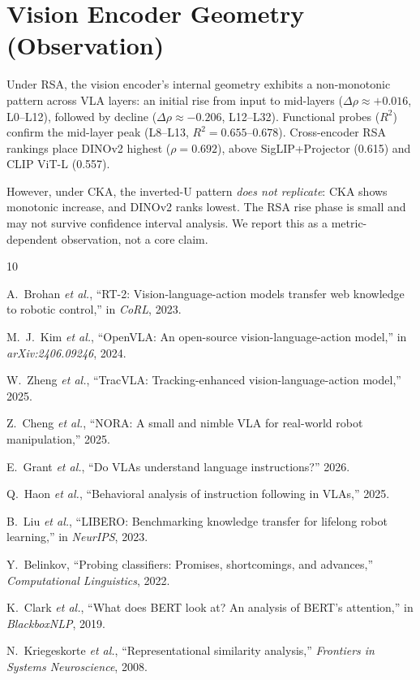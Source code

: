 \documentclass[10pt,twocolumn]{article}
\newcommand{\etal}{\textit{et al.}}
\begin{document}
\appendix
\section{Vision Encoder Geometry (Observation)}
\label{app:c3}

Under RSA, the vision encoder's internal geometry exhibits a non-monotonic pattern across VLA layers: an initial rise from input to mid-layers ($\Delta\rho \approx +0.016$, L0--L12), followed by decline ($\Delta\rho \approx -0.206$, L12--L32).
Functional probes ($R^2$) confirm the mid-layer peak (L8--L13, $R^2 = 0.655$--$0.678$).
Cross-encoder RSA rankings place DINOv2 highest ($\rho = 0.692$), above SigLIP+Projector (0.615) and CLIP ViT-L (0.557).

However, under CKA, the inverted-U pattern \emph{does not replicate}: CKA shows monotonic increase, and DINOv2 ranks lowest.
The RSA rise phase is small and may not survive confidence interval analysis.
We report this as a metric-dependent observation, not a core claim.

{\small

\begin{thebibliography}{10}

A.~Brohan \etal, ``RT-2: Vision-language-action models transfer web knowledge to robotic control,'' in \emph{CoRL}, 2023.

M.~J.~Kim \etal, ``OpenVLA: An open-source vision-language-action model,'' in \emph{arXiv:2406.09246}, 2024.

W.~Zheng \etal, ``TracVLA: Tracking-enhanced vision-language-action model,'' 2025.

Z.~Cheng \etal, ``NORA: A small and nimble VLA for real-world robot manipulation,'' 2025.

E.~Grant \etal, ``Do VLAs understand language instructions?'' 2026.

Q.~Haon \etal, ``Behavioral analysis of instruction following in VLAs,'' 2025.

B.~Liu \etal, ``LIBERO: Benchmarking knowledge transfer for lifelong robot learning,'' in \emph{NeurIPS}, 2023.

Y.~Belinkov, ``Probing classifiers: Promises, shortcomings, and advances,'' \emph{Computational Linguistics}, 2022.

K.~Clark \etal, ``What does BERT look at? An analysis of BERT's attention,'' in \emph{BlackboxNLP}, 2019.

N.~Kriegeskorte \etal, ``Representational similarity analysis,'' \emph{Frontiers in Systems Neuroscience}, 2008.

\end{thebibliography}
}
\end{document}
